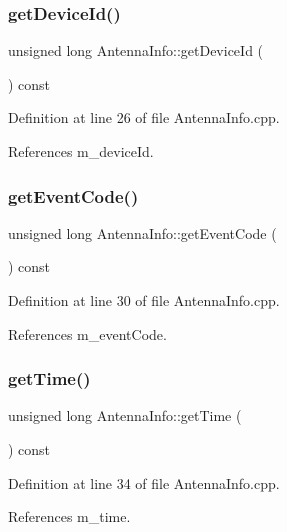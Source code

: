 \mbox{\label{class_antenna_info_a25a6a3ca6afeba45c00f2312b8d2d9de}} 
\subsubsection{getDeviceId()}
{\footnotesize\ttfamily unsigned long Antenna\+Info\+::get\+Device\+Id (\begin{DoxyParamCaption}{ }\end{DoxyParamCaption}) const}



Definition at line 26 of file Antenna\+Info.\+cpp.



References m\+\_\+device\+Id.

\mbox{\label{class_antenna_info_a898d46ed6fd2676e370ae8c325ffd679}} 
\subsubsection{getEventCode()}
{\footnotesize\ttfamily unsigned long Antenna\+Info\+::get\+Event\+Code (\begin{DoxyParamCaption}{ }\end{DoxyParamCaption}) const}



Definition at line 30 of file Antenna\+Info.\+cpp.



References m\+\_\+event\+Code.

\mbox{\label{class_antenna_info_aaae1e1105ba4a724c0061e3f7904b1e5}} 
\subsubsection{getTime()}
{\footnotesize\ttfamily unsigned long Antenna\+Info\+::get\+Time (\begin{DoxyParamCaption}{ }\end{DoxyParamCaption}) const}



Definition at line 34 of file Antenna\+Info.\+cpp.



References m\+\_\+time.

